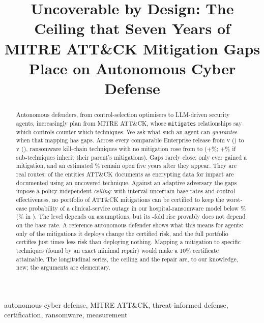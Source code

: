 \documentclass[conference,compsoc]{IEEEtran}
\begin{document}
\title{Uncoverable by Design: The Ceiling that Seven Years of\\
MITRE ATT\&CK Mitigation Gaps Place on Autonomous Cyber Defense}
\author{}
\maketitle

\begin{abstract}
Autonomous defenders, from control-selection optimisers to LLM-driven security agents,
increasingly plan from MITRE ATT\&CK, whose \texttt{mitigates} relationships say which
controls counter which techniques. We ask what such an agent can \emph{guarantee} when
that mapping has gaps. Across every comparable Enterprise release from
v\GapFirstVersion{} (\GapFirstDate) to v\GapLastVersion{} (\GapLastDate), ransomware
kill-chain techniques with no mitigation rose from \GapFirstUnc{} to \GapLastUnc{}
(+\GapUncGrowthPct\%; +\GapInhGrowthPct\% if sub-techniques inherit their parent's
mitigations). Gaps rarely close: only \CloseTotal{} ever gained a mitigation, and an
estimated \SurvFive\% remain open five years after they appear. They are real routes:
\UseExposed{} of the \UseEntities{} entities ATT\&CK documents as encrypting data for
impact are documented using an uncovered technique. Against an adaptive adversary the
gaps impose a policy-independent \emph{ceiling}: with interval-uncertain base rates and
control effectiveness, no portfolio of ATT\&CK mitigations can be certified to keep the
worst-case probability of a clinical-service outage in our hospital-ransomware model
below \GapFloorLastKOne\% (\GapFloorFirstKOne\% in \GapFirstDate). The level depends on
assumptions, but its \GapFloorGrowth-fold rise provably does not depend on the base rate.
A reference autonomous defender shows what this means for agents: only
\GreedyImproving{} of the \GreedySteps{} mitigations it deploys change the certified
risk, and the full portfolio certifies just \GreedyGainLast{} times less risk than
deploying nothing. Mapping a mitigation to \GapRepTenOne{} specific techniques (found by
an exact minimal repair) would make a 10\% certificate attainable. The longitudinal
series, the ceiling and the repair are, to our knowledge, new; the arguments are
elementary.
\end{abstract}

\begin{IEEEkeywords}
autonomous cyber defense, MITRE ATT\&CK, threat-informed defense, certification,
ransomware, measurement
\end{IEEEkeywords}
\end{document}
